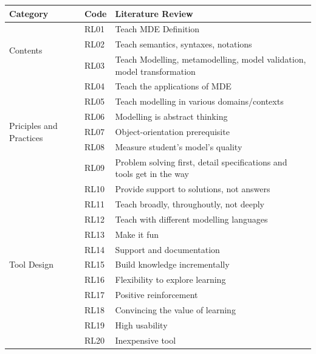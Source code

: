 \documentclass[12pt, a4paper]{report}
\begin{document}
\setcounter{rowcount}{0}
\begin{center}
\begin{tabular}{ |p{2cm}|p{1cm}|p{10cm}| } 
\hline
Category & Code & Literature Review \\
\hline
\multirow{3}{2cm}{Contents} 
& RL01 & Teach MDE Definition \\ 
& RL02 & Teach semantics, syntaxes, notations \\ 
& RL03 & Teach Modelling, metamodelling, model validation, model transformation\\
& RL04 & Teach the applications of MDE \\
& RL05 & Teach modelling in various domains/contexts \\

\hline
\multirow{3}{2cm}{Priciples and Practices} 
& RL06 & Modelling is abstract thinking \\ 
& RL07 & Object-orientation prerequisite \\
& RL08 & Measure student's model's quality \\
& RL09 & Problem solving first, detail specifications and tools get in the way \\
& RL10 & Provide support to solutions, not answers \\ 
& RL11 & Teach broadly, throughoutly, not deeply \\
& RL12 & Teach with different modelling languages \\  
& RL13 & Make it fun \\ 
\hline
\multirow{3}{2cm}{Tool Design}
& RL14 & Support and documentation \\
& RL15 & Build knowledge incrementally \\
& RL16 & Flexibility to explore learning \\
& RL17 & Positive reinforcement \\
& RL18 & Convincing the value of learning \\ 
& RL19 & High usability \\ 
& RL20 & Inexpensive tool \\ 
\hline
\end{tabular}
\end{center}
\end{document}
